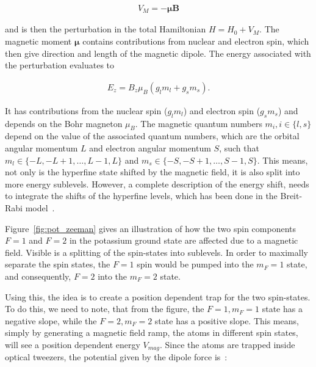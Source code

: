 \begin{align}
	V_M = - \bm{\mu} \bm{B}
\end{align}

and is then the perturbation in the total Hamiltonian $H = H_0 + V_M$. The magnetic moment $\bm{\mu}$ contains contributions from nuclear and electron spin, which then give direction and length of the magnetic dipole. The energy associated with the perturbation evaluates to

\begin{align}
	E_z = B_z \mu_B \left(g_l m_l + g_s m_s\right).
\end{align}

It has contributions from the nuclear spin ($g_l m_l$) and electron spin ($g_s m_s$) and depends on the Bohr magneton $\mu_B$. The magnetic quantum numbers $m_i, i\in\{l,s\}$ depend on the value of the associated quantum numbers, which are the orbital angular momentum $L$ and electron angular momentum $S$, such that $m_l \in \{-L, -L+1, \ldots, L-1, L\}$ and $m_s \in \{-S, -S+1, \ldots, S-1, S\}$. This means, not only is the hyperfine state shifted by the magnetic field, it is also split into more energy sublevels. However, a complete description of the energy shift, needs to integrate the shifts of the hyperfine levels, which has been done in the Breit-Rabi model~\cite{Breit1931}.

Figure~\ref{fig:pot_zeeman} gives an illustration of how the two spin components $F=1$ and $F=2$ in the potassium ground state are affected due to a magnetic field. Visible is a splitting of the spin-states into sublevels. In order to maximally separate the spin states, the $F=1$ spin would be pumped into the $m_F=1$ state, and consequently, $F=2$ into the $m_F=2$ state.


Using this, the idea is to create a position dependent trap for the two spin-states. To do this, we need to note, that from the figure, the $F=1, m_F=1$ state has a negative slope, while the $F=2, m_F=2$ state has a positive slope. This means, simply by generating a magnetic field ramp, the atoms in different spin states, will see a position dependent energy $V_{mag}$. Since the atoms are trapped inside optical tweezers, the potential given by the dipole force is~\cite{LeKien2013}:

